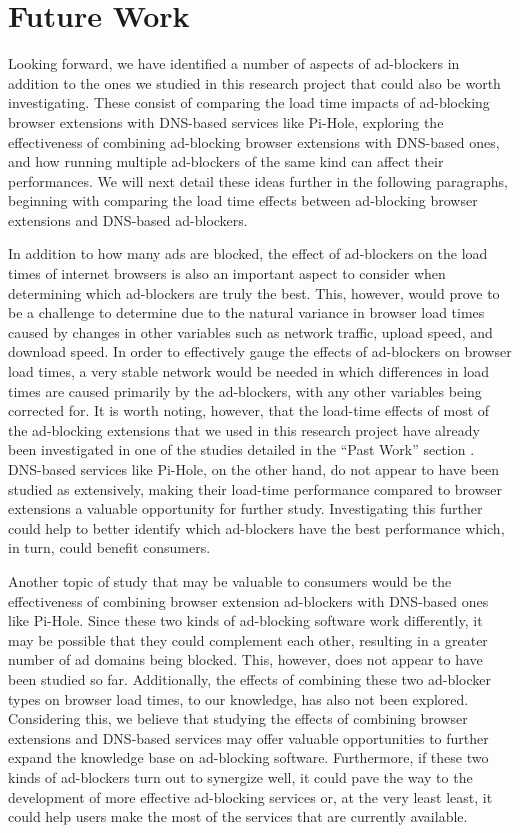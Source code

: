 \documentclass[sigsmall]{acmart}
\begin{document}
\section*{Future Work}
 Looking forward, we have identified a number of aspects of ad-blockers in addition to the ones we studied in this research project that could also be worth investigating. These consist of comparing the load time impacts of ad-blocking browser extensions with DNS-based services like Pi-Hole, exploring the effectiveness of combining ad-blocking browser extensions with DNS-based ones, and how running multiple ad-blockers of the same kind can affect their performances. We will next detail these ideas further in the following paragraphs, beginning with comparing the load time effects between ad-blocking browser extensions and DNS-based ad-blockers.

 In addition to how many ads are blocked, the effect of ad-blockers on the load times of internet browsers is also an important aspect to consider when determining which ad-blockers are truly the best. This, however, would prove to be a challenge to determine due to the natural variance in browser load times caused by changes in other variables such as network traffic, upload speed, and download speed. In order to effectively gauge the effects of ad-blockers on browser load times, a very stable network would be needed in which differences in load times are caused primarily by the ad-blockers, with any other variables being corrected for. It is worth noting, however, that the load-time effects of most of the ad-blocking extensions that we used in this research project have already been investigated in one of the studies detailed in the “Past Work” section \cite{10.1145/3091478.3091514}. DNS-based services like Pi-Hole, on the other hand, do not appear to have been studied as extensively, making their load-time performance compared to browser extensions a valuable opportunity for further study. Investigating this further could help to better identify which ad-blockers have the best performance which, in turn, could benefit consumers.
	
 Another topic of study that may be valuable to consumers would be the effectiveness of combining browser extension ad-blockers with DNS-based ones like Pi-Hole. Since these two kinds of ad-blocking software work differently, it may be possible that they could complement each other, resulting in a greater number of ad domains being blocked. This, however, does not appear to have been studied so far. Additionally, the effects of combining these two ad-blocker types on browser load times, to our knowledge, has also not been explored. Considering this, we believe that studying the effects of combining browser extensions and DNS-based services may offer valuable opportunities to further expand the knowledge base on ad-blocking software. Furthermore, if these two kinds of ad-blockers turn out to synergize well, it could pave the way to the development of more effective ad-blocking services or, at the very least least, it could help users make the most of the services that are currently available.
	
\end{document}
